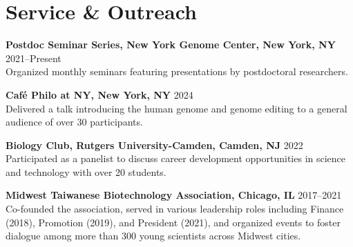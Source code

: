 \documentclass[letterpaper,11pt]{cv}
\begin{document}
\section{Service \& Outreach}
\begin{entrylist}
    \item \textbf{Postdoc Seminar Series, New York Genome Center, New York, NY} \hfill 2021--Present \\
    {\small Organized monthly seminars featuring presentations by postdoctoral researchers.}
    \item \textbf{Café Philo at NY, New York, NY} \hfill 2024 \\
    {\small Delivered a talk introducing the human genome and genome editing to a general audience of over 30 participants.}
    \item \textbf{Biology Club, Rutgers University-Camden, Camden, NJ} \hfill 2022 \\
    {\small Participated as a panelist to discuss career development opportunities in science and technology with over 20 students.}
    \item \textbf{Midwest Taiwanese Biotechnology Association, Chicago, IL} \hfill 2017--2021 \\
    {\small Co-founded the association, served in various leadership roles including Finance (2018), Promotion (2019), and President (2021), and organized events to foster dialogue among more than 300 young scientists across Midwest cities.}

\end{entrylist}
\end{document}
